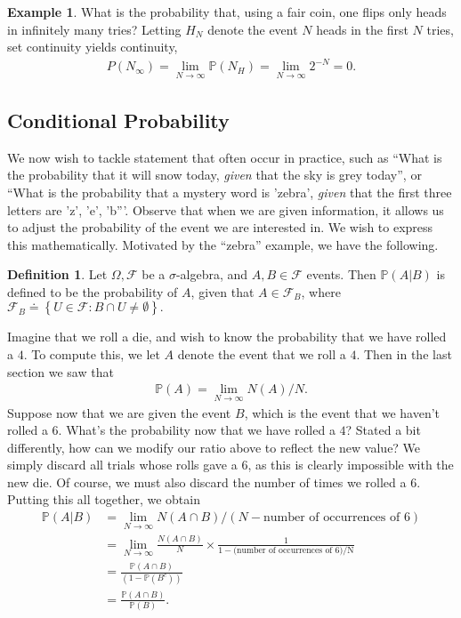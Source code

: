 \documentclass[12pt]{article}
\newcommand{\filter}{\mathcal{F}}
\newcommand{\prob}{\mathbb{P}}
\theoremstyle{plain}
\theoremstyle{definition}
\newtheorem*{definition}{Definition}
\newtheorem*{example}{Example}
\theoremstyle{remark}
\numberwithin{equation}{section}  %
\begin{document}
\begin{example}What is the probability that, using a fair coin, one
flips only heads in infinitely many tries? Letting $H_N$ denote the event
$N$ heads in the first $N$ tries, set continuity yields
continuity,
\begin{align*}
P(N_\infty) = \lim_{N \to \infty} \prob(N_H) = \lim_{N \to \infty} 2^{-N} = 0.
\end{align*}
\end{example}
\subsection{Conditional Probability}
We now wish to tackle statement that often occur in practice,
such as ``What is the probability that it will snow today, \emph{given}
that the sky is grey today'', or ``What is the probability that a mystery word
is 'zebra', \emph{given} that the first three letters are 'z', 'e', 'b'''.
Observe that when we are given information, it allows us to adjust the
probability of the event we are interested in. We wish to express this
mathematically. Motivated by the ``zebra'' example, we have the following.
\begin{definition}
Let $\Omega, \filter$ be a $\sigma$-algebra, and $A, B \in \filter$ events. 
Then $\prob(A | B)$ is defined to be the probability of $A$, given that $A \in \filter_B$, where $\filter_B
\doteq \left\{ U \in \filter: B \cap U \neq \emptyset \right\}.$
\end{definition}
Imagine that we roll a die, and wish to know the probability that
we have rolled a $4$. 
To compute this, we let $A$ denote the event that we roll a $4$. Then in the last section we saw
that
\begin{align*}
\prob(A) = \lim_{N \to \infty} N(A)/N.
\end{align*}
Suppose now that we are given the event $B$, which is the event that we haven't
rolled a $6$.
What's the probability now that we have rolled a $4$?
Stated a bit differently, how can we modify our ratio above to reflect the
new value? We simply discard all trials whose rolls gave a $6$, as this is clearly
impossible with the new die. Of course, we must also discard the number of times
we rolled a $6$. Putting this all together, we obtain
\begin{align*}
\prob(A | B) & = \lim_{N \to \infty} N(A \cap B)/(N -
\text{number of occurrences of $6$})
\\
& = \lim_{N \to \infty} \frac{N(A \cap B)}{N} \times \frac{1}{1 - (\text{number
of occurrences of $6$)/N}}
\\
& = \frac{\prob(A \cap B)}{(1 - \prob(B^c))}
\\
& = \frac{\prob(A \cap B)}{\prob(B)}.
\end{align*}
\end{document}
